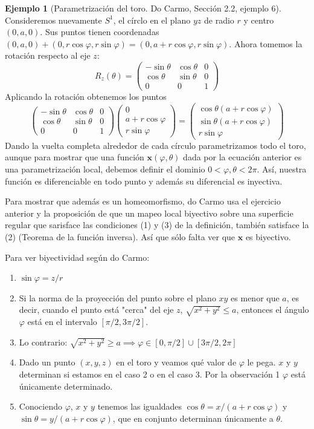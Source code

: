 \documentclass[spanish]{book}
\theoremstyle{definition}
\newtheorem*{ejem}{Ejemplo}
\begin{document}
\begin{ejem}[Parametrización del toro. Do Carmo, Sección 2.2, ejemplo 6]
	Consideremos nuevamente $S^1$, el círclo en el plano $yz$ de radio $r$ y centro $(0,a,0)$. Sus puntos tienen coordenadas $(0,a,0)+(0,r\cos{\varphi},r\sin{\varphi})=(0,a+r\cos{\varphi},r\sin{\varphi})$. Ahora tomemos la rotación respecto al eje $z$:
	\[R_z(\theta)=\begin{pmatrix}-\sin\theta&\cos\theta&0\\ \cos\theta&\sin\theta&0\\0&0&1\end{pmatrix}\]
	Aplicando la rotación obtenemos los puntos
	\[\begin{pmatrix}-\sin\theta&\cos\theta&0\\ \cos\theta&\sin\theta&0\\0&0&1\end{pmatrix}\begin{pmatrix}0\\a+r\cos\varphi\\ r\sin{\varphi}\end{pmatrix}
	=\begin{pmatrix}\cos\theta(a+r\cos{\varphi})\\ \sin\theta(a+r\cos\varphi)\\r\sin\varphi\end{pmatrix}\]
	Dando la vuelta completa alrededor de cada círculo parametrizamos todo el toro, aunque para mostrar que una función $\mathbf{x}(\varphi,\theta)$ dada por la ecuación anterior es una parametrización local, debemos definir el dominio $0<\varphi,\theta<2\pi$. Así, nuestra función es diferenciable en todo punto y además su diferencial es inyectiva.
	
	Para mostrar que además es un homeomorfismo, do Carmo usa el ejercicio anterior y la proposición de que un mapeo local biyectivo sobre una superficie regular que sarisface las condiciones (1) y (3) de la definición, también satisface la (2) (Teorema de la función inversa). Así que sólo falta ver que $\mathbf{x}$ es biyectivo.
	
	Para ver biyectividad según do Carmo:
	\begin{enumerate}
		\item $\sin\varphi=z/r$
		\item Si la norma de la proyección del punto sobre el plano $xy$ es menor que $a$, es decir, cuando el punto está "cerca" del eje $z$, $\sqrt{x^2+y^2}\leq a$, entonces el ángulo $\varphi$ está en el intervalo $[\pi/2,3\pi/2]$.
		\item Lo contrario: $\sqrt{x^2+y^2}\geq a\implies\varphi\in[0,\pi/2]\cup[3\pi/2,2\pi]$
		\item Dado un punto $(x,y,z)$ en el toro y veamos qué valor de $\varphi$ le pega. $x$ y $y$ determinan si estamos en el caso 2 o en el caso 3. Por la observación 1 $\varphi$ está únicamente determinado.
		\item Conociendo $\varphi$, $x$ y $y$ tenemos las igualdades $\cos\theta=x/(a+r\cos\varphi)$ y $\sin\theta=y/(a+r\cos\varphi)$, que en conjunto determinan únicamente a $\theta$.
	\end{enumerate}
\end{ejem}
\end{document}
